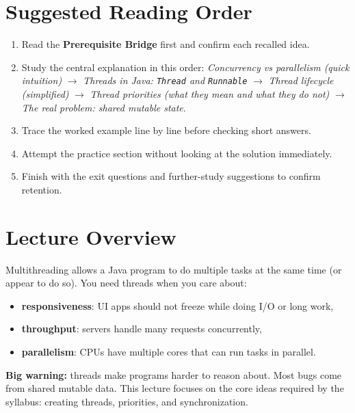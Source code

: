 \documentclass[11pt]{article}
\begin{document}
\section{Suggested Reading Order}
\begin{enumerate}
  \item Read the \textbf{Prerequisite Bridge} first and confirm each recalled idea.
  \item Study the central explanation in this order: \textit{Concurrency vs parallelism (quick intuition)} $\rightarrow$ \textit{Threads in Java: \texttt{Thread} and \texttt{Runnable}} $\rightarrow$ \textit{Thread lifecycle (simplified)} $\rightarrow$ \textit{Thread priorities (what they mean and what they do not)} $\rightarrow$ \textit{The real problem: shared mutable state}.
  \item Trace the worked example line by line before checking short answers.
  \item Attempt the practice section without looking at the solution immediately.
  \item Finish with the exit questions and further-study suggestions to confirm retention.
\end{enumerate}
\notesources{\OOPSUnitIIISources}

\section{Lecture Overview}
Multithreading allows a Java program to do multiple tasks at the same time (or appear to do so).
You need threads when you care about:
\begin{itemize}
  \item \textbf{responsiveness}: UI apps should not freeze while doing I/O or long work,
  \item \textbf{throughput}: servers handle many requests concurrently,
  \item \textbf{parallelism}: CPUs have multiple cores that can run tasks in parallel.
\end{itemize}
\textbf{Big warning:} threads make programs harder to reason about. Most bugs come from shared mutable data.
This lecture focuses on the core ideas required by the syllabus: creating threads, priorities, and synchronization.
\notesources{\OOPSUnitIIISources}
\end{document}
